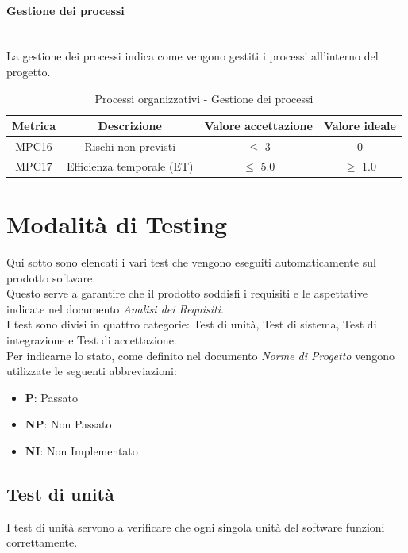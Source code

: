 \documentclass[10pt]{article}
\begin{document}
\begin{justify}
\paragraph{Gestione dei processi}\mbox{}\\
La gestione dei processi indica come vengono gestiti i processi all'interno del progetto.\\
\begin{table}[H]
  \centering
\begin{tabular}{|c|c|c|c|}
  \hline
  \textbf{Metrica} & \textbf{Descrizione} & \textbf{Valore accettazione} & \textbf{Valore ideale}\\
  \hline
  MPC16 & Rischi non previsti & $\leq$ 3 & 0 \\
  \hline
  MPC17 & Efficienza temporale (ET) & $\leq$ 5.0 & $\geq$ 1.0 \\
  \hline
\end{tabular}
\caption{Processi organizzativi - Gestione dei processi}
\label{tab:gestione dei processi}
\end{table}
\newpage

\section{Modalità di Testing}
Qui sotto sono elencati i vari test che vengono eseguiti automaticamente sul prodotto software.\\
Questo serve a garantire che il prodotto soddisfi i requisiti e le aspettative indicate nel documento \textit{Analisi dei Requisiti}.\\
I test sono divisi in quattro categorie: Test di unità, Test di sistema, Test di integrazione e Test di accettazione.\\
Per indicarne lo stato, come definito nel documento \textit{Norme di Progetto} vengono utilizzate le seguenti abbreviazioni:
\begin{itemize}
\item \textbf{P}: Passato
\item \textbf{NP}: Non Passato
\item \textbf{NI}: Non Implementato
\end{itemize}

\subsection{Test di unità}
I test di unità servono a verificare che ogni singola unità del software funzioni correttamente.\\


\end{justify}
\end{document}
